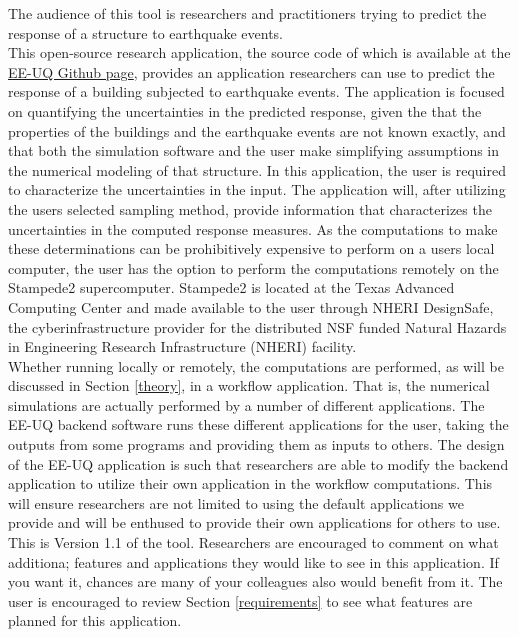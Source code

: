 The audience of this tool is researchers and practitioners trying to
predict the response of a structure to earthquake events.\\

This open-source research application, the source code of which is available at the \href{https://github.com/NHERI-SimCenter/EE-UQ}{EE-UQ Github page},
provides an application researchers can use to predict the response of a building subjected to earthquake events. The application is focused on quantifying the uncertainties in the predicted response, given the that the properties of the buildings and the earthquake events are not known exactly, and that both the simulation software and the user make simplifying assumptions in the numerical modeling of that structure. In this application, the user is required to characterize
the uncertainties in the input. The application will, after utilizing the users selected sampling method, provide information that characterizes the uncertainties in the computed response measures. As the computations to make these determinations can be prohibitively expensive to perform on a users local computer, the user has the option to perform the computations remotely on the Stampede2 supercomputer. Stampede2 is located at the Texas Advanced Computing Center and made available to the user through NHERI DesignSafe, the cyberinfrastructure provider for the distributed NSF funded Natural Hazards in Engineering Research
Infrastructure (NHERI) facility.\\

Whether running locally or remotely, the computations are performed, as will be discussed in Section \ref{theory}, in a workflow application. That is, the numerical simulations are actually performed by a number of different applications. The EE-UQ backend software runs these different applications for the user, taking the outputs from some programs and providing them as inputs to others. The design of the EE-UQ application is such that researchers are able to modify the backend application to utilize their own application in the workflow computations. This will ensure researchers are not limited to using
the default applications we provide and will be enthused to provide their own applications for others to use. \\

This is Version 1.1 of the tool. Researchers are encouraged to comment on what additiona; features and applications they would like to see in this application. If you want it, chances are many of your colleagues also would benefit from it. The user is encouraged to review Section \ref{requirements} to see what features are planned for this application. 
